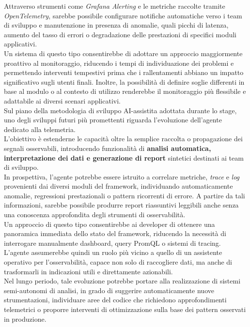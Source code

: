 Attraverso strumenti come \emph{Grafana Alerting} e le metriche raccolte tramite
\emph{OpenTelemetry}, sarebbe possibile configurare notifiche automatiche verso i
team di sviluppo e manutenzione in presenza di anomalie, quali picchi di latenza,
aumento del tasso di errori o degradazione delle prestazioni di specifici moduli
applicativi.\\
Un sistema di questo tipo consentirebbe di adottare un approccio maggiormente
proattivo al monitoraggio, riducendo i tempi di individuazione dei problemi e
permettendo interventi tempestivi prima che i rallentamenti abbiano un impatto
significativo sugli utenti finali. Inoltre, la possibilità di definire soglie
differenti in base al modulo o al contesto di utilizzo renderebbe il monitoraggio
più flessibile e adattabile ai diversi scenari applicativi.\\
Sul piano della metodologia di sviluppo AI-assistita adottata durante lo stage,
uno degli sviluppi futuri più promettenti riguarda l’evoluzione dell’agente dedicato
alla telemetria.\\
L’obiettivo è estenderne le capacità oltre la semplice raccolta o propagazione dei
segnali osservabili, introducendo funzionalità di \textbf{analisi automatica, interpretazione
      dei dati e generazione di report} sintetici destinati ai team di sviluppo.\\
In prospettiva, l’agente potrebbe essere istruito a correlare metriche, \emph{trace}
e \emph{log} provenienti dai diversi moduli del framework, individuando automaticamente
anomalie, regressioni prestazionali o pattern ricorrenti di errore. A partire da tali
informazioni, sarebbe possibile produrre report riassuntivi leggibili anche senza
una conoscenza approfondita degli strumenti di osservabilità.\\
Un approccio di questo tipo consentirebbe ai developer di ottenere una panoramica
immediata dello stato del framework, riducendo la necessità di interrogare manualmente
dashboard, query PromQL o sistemi di tracing.\\
L’agente assumerebbe quindi un ruolo più vicino a quello di un assistente operativo
per l’osservabilità, capace non solo di raccogliere dati, ma anche di trasformarli in
indicazioni utili e direttamente azionabili.\\
Nel lungo periodo, tale evoluzione potrebbe portare alla realizzazione di sistemi
semi-autonomi di analisi, in grado di suggerire automaticamente nuove strumentazioni,
individuare aree del codice che richiedono approfondimenti telemetrici o proporre
interventi di ottimizzazione sulla base dei pattern osservati in produzione.

